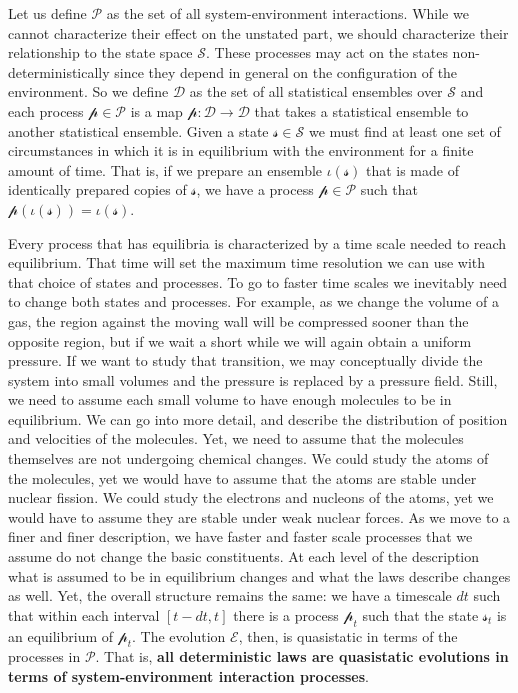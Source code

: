 \documentclass[11pt]{article}
\begin{document}
Let us define $\mathcal{P}$ as the set of all system-environment interactions. While we cannot characterize their effect on the unstated part, we should characterize their relationship to the state space $\mathcal{S}$. These processes may act on the states non-deterministically since they depend in general on the configuration of the environment. So we define $\mathcal{D}$ as the set of all statistical ensembles over $\mathcal{S}$ and each process $\mathcal{p} \in \mathcal{P}$ is a map $\mathcal{p} : \mathcal{D} \to \mathcal{D}$ that takes a statistical ensemble to another statistical ensemble. Given a state $\mathcal{s} \in \mathcal{S}$ we must find at least one set of circumstances in which it is in equilibrium with the environment for a finite amount of time. That is, if we prepare an ensemble $\iota(\mathcal{s})$ that is made of identically prepared copies of $\mathcal{s}$, we have a process $\mathcal{p} \in \mathcal{P}$ such that $\mathcal{p}(\iota(\mathcal{s})) = \iota(\mathcal{s})$.

Every process that has equilibria is characterized by a time scale needed to reach equilibrium. That time will set the maximum time resolution we can use with that choice of states and processes. To go to faster time scales we inevitably need to change both states and processes. For example, as we change the volume of a gas, the region against the moving wall will be compressed sooner than the opposite region, but if we wait a short while we will again obtain a uniform pressure. If we want to study that transition, we may conceptually divide the system into small volumes and the pressure is replaced by a pressure field. Still, we need to assume each small volume to have enough molecules to be in equilibrium. We can go into more detail, and describe the distribution of position and velocities of the molecules. Yet, we need to assume that the molecules themselves are not undergoing chemical changes. We could study the atoms of the molecules, yet we would have to assume that the atoms are stable under nuclear fission. We could study the electrons and nucleons of the atoms, yet we would have to assume they are stable under weak nuclear forces. As we move to a finer and finer description, we have faster and faster scale processes that we assume do not change the basic constituents. At each level of the description what is assumed to be in equilibrium changes and what the laws describe changes as well. Yet, the overall structure remains the same: we have a timescale $dt$ such that within each interval $[t-dt, t]$ there is a process $\mathcal{p}_t$ such that the state $\mathcal{s}_t$ is an equilibrium of $\mathcal{p}_t$. The evolution $\mathcal{E}$, then, is quasistatic in terms of the processes in $\mathcal{P}$. That is, \textbf{all deterministic laws are quasistatic evolutions in terms of system-environment interaction processes}.
\end{document}
